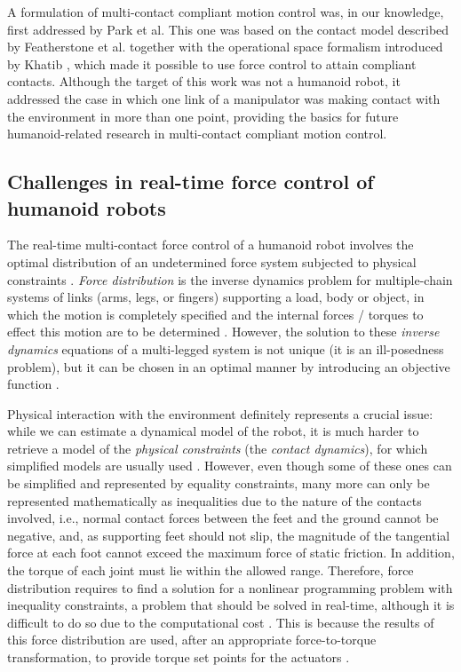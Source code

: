 		A formulation of multi-contact compliant motion control was, in our knowledge, first addressed
		by Park et al. \cite{Park_ICRA2004}
		This one was based on the contact model described by Featherstone et al. \cite{Featherstone_ICRA1999}
		together with the operational space formalism introduced by Khatib \cite{Khatib_RoboticsAuto1987},
		which made it possible to use force control to attain compliant contacts.
		Although the target of this work was not a humanoid robot, it addressed the case in which one
		link of a manipulator	was making contact with the environment in more than one point, providing
		the basics for future humanoid-related research in multi-contact compliant motion control.
		
	\subsection{Challenges in real-time force control of humanoid robots}
		\label{sub:challenges}
		
		The real-time multi-contact force control of a humanoid robot involves the optimal distribution of an
		undetermined force system subjected to physical constraints \cite{Chen_MIRC1999}
		\cite{Nahon_TransRoboticsAuto1992}.
		\emph{Force distribution} is the inverse dynamics problem for multiple-chain systems of links (arms,
		legs, or fingers) supporting a load, body or object, in which the motion is completely specified and
		the internal forces / torques to effect	this motion are to be determined \cite{Orin_AdvRobotics1989}.
		However, the solution to these \emph{inverse dynamics} equations of a multi-legged system is not unique
		(it is an ill-posedness problem),	but it can be chosen in an optimal manner by introducing an
		objective function \cite{Hyon_TransRobotics2007} \cite{Chen_MIRC1999}.
		
		Physical interaction with the environment definitely represents a crucial issue:
		while we can estimate a dynamical model of the robot, it is much harder to retrieve a model of the
		\emph{physical constraints} (the \emph{contact dynamics}), for which simplified models are usually
		used \cite{DelPrete_PhDThesis2013}.
		However, even though some of these ones can be simplified and represented by equality constraints,
		many more can only be represented mathematically as inequalities due to the nature of the
		contacts involved, i.e., normal contact forces between the feet and the ground cannot be negative,
		and, as supporting feet should not slip, the magnitude of the tangential force at each foot cannot
		exceed the maximum force of	static friction.
		In addition, the torque of each joint must lie within the allowed range.
		Therefore, force distribution requires to find a solution for a nonlinear programming problem
		with inequality constraints, a problem that should be solved in real-time, although it is difficult
		to do so due to the computational cost \cite{Chen_MIRC1999}.
		This is because the results of this force distribution are used, after an appropriate force-to-torque
		transformation, to provide torque set points for the actuators \cite{Nahon_TransRoboticsAuto1992}.